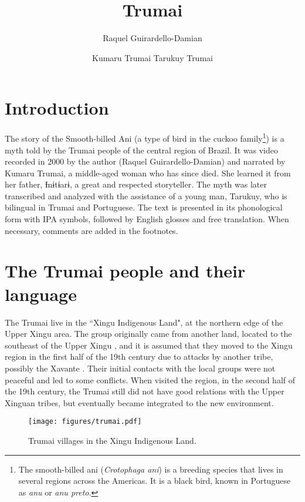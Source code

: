 \documentclass[output=paper,
modfonts,nonflat
]{langsci/langscibook}
\author{Raquel Guirardello-Damian\affiliation{University of Bristol, England and Museu Paraense Emílio Goeldi, Brazil}%
\and Kumaru Trumai%
\lastand Tarukuy Trumai%
}%
\title{Trumai}
\begin{document}
\section{Introduction}

The story of the Smooth-billed Ani (a type of bird in the cuckoo family\footnote{The smooth-billed ani (\textit{Crotophaga ani}) is a breeding species that lives in several regions across the Americas. It is a black bird, known in Portuguese as \textit{anu} or \textit{anu preto}.}) is a myth told by the Trumai people of the central region of Brazil. It was video recorded in 2000 by the author (Raquel Guirardello-Damian) and narrated by Kumaru Trumai, a middle-aged woman who has since died. She learned it from her father, Ɨnɨtɨarɨ, a great and respected storyteller. The myth was later transcribed and analyzed with the assistance of a young man, Tarukuy, who is bilingual in Trumai and Portuguese. The text is presented in its phonological form with IPA symbols, followed by English glosses and free translation. When necessary, comments are added in the footnotes.



\section{The Trumai people and their language}
The Trumai live in the “Xingu Indigenous Land", at the northern edge of the Upper Xingu area. The group originally came from another land, located to the southeast of the Upper Xingu \citep{MurphyQuain1955}, and it is assumed that they moved to the Xingu region in the first half of the 19th century due to attacks by another tribe, possibly the Xavante \citep{VillasBoas1970}. Their initial contacts with the local groups were not peaceful and led to some conflicts. When \citet{Steinen1940} visited the region, in the second half of the 19th century, the Trumai still did not have good relations with the Upper Xinguan tribes, but eventually became integrated to the new environment.

\begin{figure}[t]
\texttt{[image: figures/trumai.pdf]}
  \caption{Trumai villages in the Xingu Indigenous Land.}
\end{figure}
\end{document}
